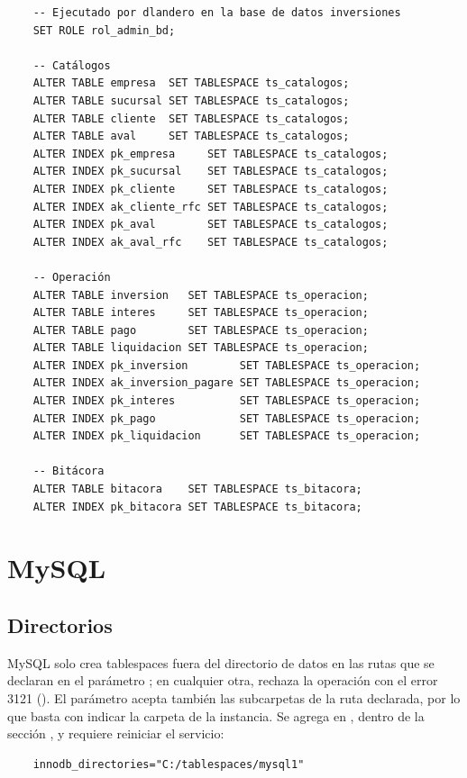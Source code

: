 \begin{verbatim}
	-- Ejecutado por dlandero en la base de datos inversiones
	SET ROLE rol_admin_bd;

	-- Catálogos
	ALTER TABLE empresa  SET TABLESPACE ts_catalogos;
	ALTER TABLE sucursal SET TABLESPACE ts_catalogos;
	ALTER TABLE cliente  SET TABLESPACE ts_catalogos;
	ALTER TABLE aval     SET TABLESPACE ts_catalogos;
	ALTER INDEX pk_empresa     SET TABLESPACE ts_catalogos;
	ALTER INDEX pk_sucursal    SET TABLESPACE ts_catalogos;
	ALTER INDEX pk_cliente     SET TABLESPACE ts_catalogos;
	ALTER INDEX ak_cliente_rfc SET TABLESPACE ts_catalogos;
	ALTER INDEX pk_aval        SET TABLESPACE ts_catalogos;
	ALTER INDEX ak_aval_rfc    SET TABLESPACE ts_catalogos;

	-- Operación
	ALTER TABLE inversion   SET TABLESPACE ts_operacion;
	ALTER TABLE interes     SET TABLESPACE ts_operacion;
	ALTER TABLE pago        SET TABLESPACE ts_operacion;
	ALTER TABLE liquidacion SET TABLESPACE ts_operacion;
	ALTER INDEX pk_inversion        SET TABLESPACE ts_operacion;
	ALTER INDEX ak_inversion_pagare SET TABLESPACE ts_operacion;
	ALTER INDEX pk_interes          SET TABLESPACE ts_operacion;
	ALTER INDEX pk_pago             SET TABLESPACE ts_operacion;
	ALTER INDEX pk_liquidacion      SET TABLESPACE ts_operacion;

	-- Bitácora
	ALTER TABLE bitacora    SET TABLESPACE ts_bitacora;
	ALTER INDEX pk_bitacora SET TABLESPACE ts_bitacora;
\end{verbatim}

\section{MySQL}

\subsection{Directorios}

MySQL solo crea tablespaces fuera del directorio de datos en las rutas que se declaran en el parámetro ; en cualquier otra, rechaza la operación con el error 3121 (). El parámetro acepta también las subcarpetas de la ruta declarada, por lo que basta con indicar la carpeta de la instancia. Se agrega en , dentro de la sección \nem{[mysqld]}, y requiere reiniciar el servicio:

\begin{verbatim}
	innodb_directories="C:/tablespaces/mysql1"
\end{verbatim}

